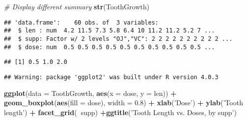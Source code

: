 \documentclass[
]{article}
\newenvironment{Shaded}{\begin{snugshade}}{\end{snugshade}}
\newcommand{\CommentTok}[1]{\textcolor[rgb]{0.56,0.35,0.01}{\textit{#1}}}
\newcommand{\DataTypeTok}[1]{\textcolor[rgb]{0.13,0.29,0.53}{#1}}
\newcommand{\FloatTok}[1]{\textcolor[rgb]{0.00,0.00,0.81}{#1}}
\newcommand{\KeywordTok}[1]{\textcolor[rgb]{0.13,0.29,0.53}{\textbf{#1}}}
\newcommand{\NormalTok}[1]{#1}
\newcommand{\OperatorTok}[1]{\textcolor[rgb]{0.81,0.36,0.00}{\textbf{#1}}}
\newcommand{\StringTok}[1]{\textcolor[rgb]{0.31,0.60,0.02}{#1}}
\begin{document}
\begin{Shaded}
\begin{Highlighting}[]
\CommentTok{# Display different summary}
\KeywordTok{str}\NormalTok{(ToothGrowth)}
\end{Highlighting}
\end{Shaded}

\begin{verbatim}
## 'data.frame':    60 obs. of  3 variables:
##  $ len : num  4.2 11.5 7.3 5.8 6.4 10 11.2 11.2 5.2 7 ...
##  $ supp: Factor w/ 2 levels "OJ","VC": 2 2 2 2 2 2 2 2 2 2 ...
##  $ dose: num  0.5 0.5 0.5 0.5 0.5 0.5 0.5 0.5 0.5 0.5 ...
\end{verbatim}

\begin{Shaded}
\end{Shaded}

\begin{verbatim}
## [1] 0.5 1.0 2.0
\end{verbatim}

\begin{Shaded}
\end{Shaded}

\begin{verbatim}
## Warning: package 'ggplot2' was built under R version 4.0.3
\end{verbatim}

\begin{Shaded}
\begin{Highlighting}[]
\KeywordTok{ggplot}\NormalTok{(}\DataTypeTok{data =}\NormalTok{ ToothGrowth, }\KeywordTok{aes}\NormalTok{(}\DataTypeTok{x =}\NormalTok{ dose, }\DataTypeTok{y =}\NormalTok{ len)) }\OperatorTok{+}\StringTok{ }
\StringTok{  }\KeywordTok{geom_boxplot}\NormalTok{(}\KeywordTok{aes}\NormalTok{(}\DataTypeTok{fill =}\NormalTok{ dose), }\DataTypeTok{width =} \FloatTok{0.8}\NormalTok{) }\OperatorTok{+}\StringTok{ }\KeywordTok{xlab}\NormalTok{(}\StringTok{'Dose'}\NormalTok{) }\OperatorTok{+}\StringTok{ }\KeywordTok{ylab}\NormalTok{(}\StringTok{'Tooth length'}\NormalTok{) }\OperatorTok{+}\StringTok{ }\KeywordTok{facet_grid}\NormalTok{(}\OperatorTok{~}\NormalTok{supp) }\OperatorTok{+}\KeywordTok{ggtitle}\NormalTok{(}\StringTok{'Tooth Length vs. Doses, by supp'}\NormalTok{)}
\end{Highlighting}
\end{Shaded}
\end{document}
